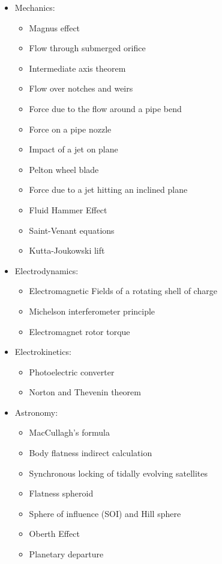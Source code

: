 \begin{itemize}
\begin{itemize}
			\end{itemize}
		\item Mechanics: 
			\begin{itemize}
				\item Magnus effect
				\item Flow through submerged orifice
				\item Intermediate axis theorem
				\item Flow over notches and weirs
				\item Force due to the flow around a pipe bend
				\item Force on a pipe nozzle
				\item Impact of a jet on plane
				\item Pelton wheel blade
				\item Force due to a jet hitting an inclined plane
				\item Fluid Hammer Effect
				\item Saint-Venant equations
				\item Kutta-Joukowski lift
			\end{itemize}	
		\item Electrodynamics:
			\begin{itemize}		
				\item Electromagnetic Fields of a rotating shell of charge
				\item Michelson interferometer principle
				\item Electromagnet rotor torque
			\end{itemize}
		\item Electrokinetics:
			\begin{itemize}		
				\item Photoelectric converter
				\item Norton and Thevenin theorem
			\end{itemize}
		\item Astronomy:
			\begin{itemize}	
				\item MacCullagh's formula
				\item Body flatness indirect calculation
				\item Synchronous locking of tidally evolving satellites	
				\item Flatness spheroid
				\item Sphere of influence (SOI) and Hill sphere
				\item Oberth Effect
				\item Planetary departure

\end{itemize}
\end{itemize}
